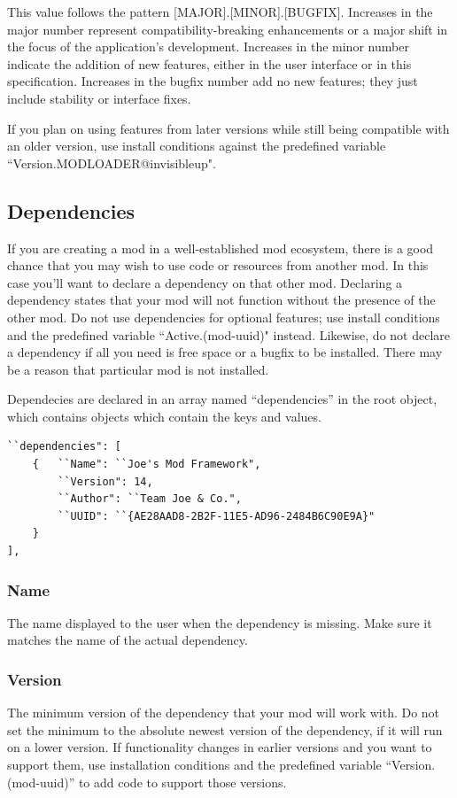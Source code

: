 \documentclass[12pt,a4paper,notitlepage]{article}
\begin{document}
This value follows the pattern [MAJOR].[MINOR].[BUGFIX]. Increases in the major number represent compatibility-breaking enhancements or a major shift in the focus of the application's development. Increases in the minor number indicate the addition of new features, either in the user interface or in this specification. Increases in the bugfix number add no new features; they just include stability or interface fixes.

If you plan on using features from later versions while still being compatible with an older version, use install conditions against the predefined variable ``Version.MODLOADER@invisibleup".

\subsection{Dependencies}
\label{subsec:create-depend}
If you are creating a mod in a well-established mod ecosystem, there is a good chance that you may wish to use code or resources from another mod. In this case you'll want to declare a dependency on that other mod. Declaring a dependency states that your mod will not function without the presence of the other mod. Do not use dependencies for optional features; use install conditions and the predefined variable ``Active.(mod-uuid)" instead. Likewise, do not declare a dependency if all you need is free space or a bugfix to be installed. There may be a reason that particular mod is not installed.

Dependecies are declared in an array named ``dependencies'' in the root object, which contains objects which contain the keys and values.

\begin{lstlisting}[breaklines=true]
``dependencies": [
    {	``Name": ``Joe's Mod Framework",
        ``Version": 14,
        ``Author": ``Team Joe & Co.",
        ``UUID": ``{AE28AAD8-2B2F-11E5-AD96-2484B6C90E9A}"
    }
],
\end{lstlisting}

\subsubsection{Name}
\label{subsubsec:create-depend-name}
The name displayed to the user when the dependency is missing. Make sure it matches the name of the actual dependency.

\subsubsection{Version}
\label{subsubsec:create-depend-ver}
The minimum version of the dependency that your mod will work with. Do not set the minimum to the absolute newest version of the dependency, if it will run on a lower version. If functionality changes in earlier versions and you want to support them, use installation conditions and the predefined variable ``Version.(mod-uuid)'' to add code to support those versions.
\end{document}
